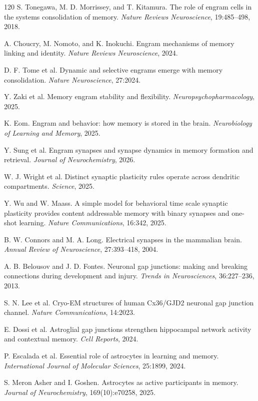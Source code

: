 \documentclass[11pt]{article}
\newcommand{\1}{\mathbf{1}}
\begin{document}
\begin{thebibliography}{120}
S. Tonegawa, M. D. Morrissey, and T. Kitamura. The role of engram cells in the systems consolidation of memory. \emph{Nature Reviews Neuroscience}, 19:485--498, 2018.

A. Choucry, M. Nomoto, and K. Inokuchi. Engram mechanisms of memory linking and identity. \emph{Nature Reviews Neuroscience}, 2024.

D. F. Tome et al. Dynamic and selective engrams emerge with memory consolidation. \emph{Nature Neuroscience}, 27:2024.

Y. Zaki et al. Memory engram stability and flexibility. \emph{Neuropsychopharmacology}, 2025.

K. Eom. Engram and behavior: how memory is stored in the brain. \emph{Neurobiology of Learning and Memory}, 2025.

Y. Sung et al. Engram synapses and synapse dynamics in memory formation and retrieval. \emph{Journal of Neurochemistry}, 2026.

W. J. Wright et al. Distinct synaptic plasticity rules operate across dendritic compartments. \emph{Science}, 2025.

Y. Wu and W. Maass. A simple model for behavioral time scale synaptic plasticity provides content addressable memory with binary synapses and one-shot learning. \emph{Nature Communications}, 16:342, 2025.

B. W. Connors and M. A. Long. Electrical synapses in the mammalian brain. \emph{Annual Review of Neuroscience}, 27:393--418, 2004.

A. B. Belousov and J. D. Fontes. Neuronal gap junctions: making and breaking connections during development and injury. \emph{Trends in Neurosciences}, 36:227--236, 2013.

S. N. Lee et al. Cryo-EM structures of human Cx36/GJD2 neuronal gap junction channel. \emph{Nature Communications}, 14:2023.

E. Dossi et al. Astroglial gap junctions strengthen hippocampal network activity and contextual memory. \emph{Cell Reports}, 2024.

P. Escalada et al. Essential role of astrocytes in learning and memory. \emph{International Journal of Molecular Sciences}, 25:1899, 2024.

S. Meron Asher and I. Goshen. Astrocytes as active participants in memory. \emph{Journal of Neurochemistry}, 169(10):e70258, 2025.


\end{thebibliography}
\end{document}
